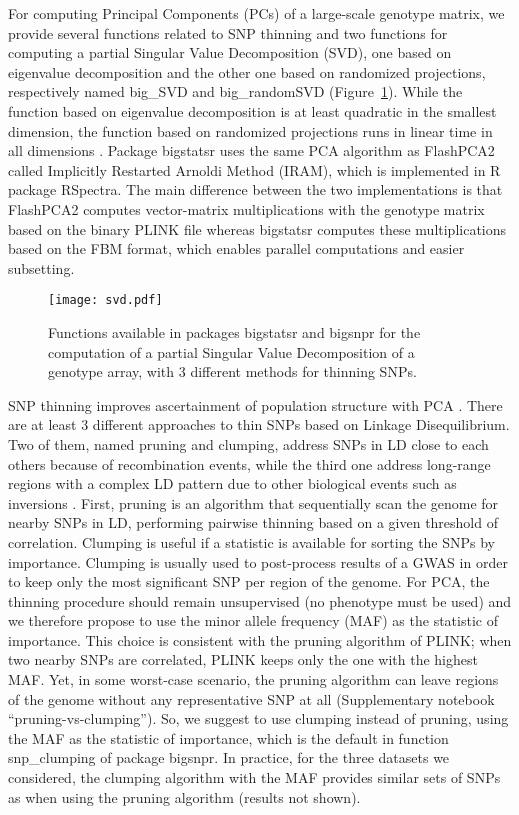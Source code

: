 \documentclass{bioinfo}
\begin{document}
\begin{methods}
For computing Principal Components (PCs) of a large-scale genotype matrix, we provide several functions related to SNP thinning and two functions for computing a partial Singular Value Decomposition (SVD), one based on eigenvalue decomposition and the other one based on randomized projections, respectively named big\_SVD and big\_randomSVD (Figure~\ref{fig:svd}). While the function based on eigenvalue decomposition is at least quadratic in the smallest dimension, the function based on randomized projections runs in linear time in all dimensions \cite[]{Lehoucq1996}. Package bigstatsr uses the same PCA algorithm as FlashPCA2 called Implicitly Restarted Arnoldi Method (IRAM), which is implemented in R package RSpectra. The main difference between the two implementations is that FlashPCA2 computes vector-matrix multiplications with the genotype matrix based on the binary PLINK file whereas bigstatsr computes these multiplications based on the FBM format, which enables parallel computations and easier subsetting. 

\begin{figure}[!tpb]
\centerline{\texttt{[image: svd.pdf]}}
\caption{Functions available in packages bigstatsr and bigsnpr for the computation of a partial Singular Value Decomposition of a genotype array, with 3 different methods for thinning SNPs.}\label{fig:svd}
\end{figure}
 
SNP thinning improves ascertainment of population structure with PCA \cite[]{Abdellaoui2013}. There are at least 3 different approaches to thin SNPs based on Linkage Disequilibrium. Two of them, named pruning and clumping, address SNPs in LD close to each others because of recombination events, while the third one address long-range regions with a complex LD pattern due to other biological events such as inversions \cite[]{Price2008}. 
First, pruning is an algorithm that sequentially scan the genome for nearby SNPs in LD, performing pairwise thinning based on a given threshold of correlation.
Clumping is useful if a statistic is available for sorting the SNPs by importance. Clumping is usually used to post-process results of a GWAS in order to keep only the most significant SNP per region of the genome. 
For PCA, the thinning procedure should remain unsupervised (no phenotype must be used) and we therefore propose to use the minor allele frequency (MAF) as the statistic of importance. 
This choice is consistent with the pruning algorithm of PLINK; when two nearby SNPs are correlated, PLINK keeps only the one with the highest MAF.
Yet, in some worst-case scenario, the pruning algorithm can leave regions of the genome without any representative SNP at all (Supplementary notebook ``pruning-vs-clumping''). 
So, we suggest to use clumping instead of pruning, using the MAF as the statistic of importance, which is the default in function snp\_clumping of package bigsnpr. In practice, for the three datasets we considered, the clumping algorithm with the MAF provides similar sets of SNPs as when using the pruning algorithm (results not shown).


\end{methods}
\end{document}
